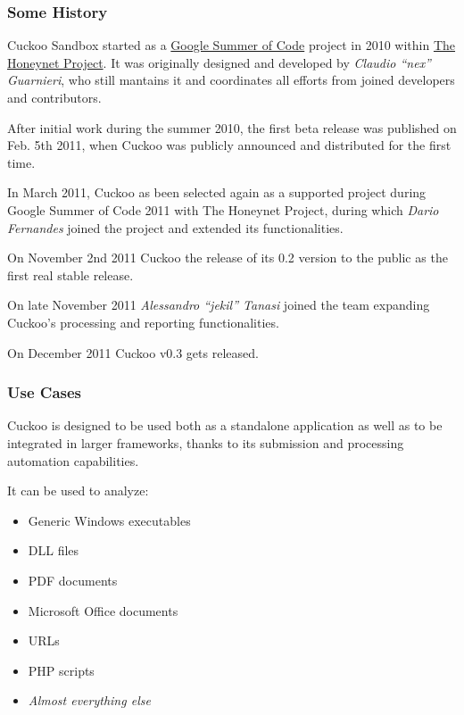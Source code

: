 \documentclass[letterpaper,10pt,english]{sphinxmanual}
\begin{document}
\subsubsection{Some History}
\label{introduction/what:some-history}
Cuckoo Sandbox started as a \href{http://www.google-melange.com}{Google Summer of Code} project in 2010 within
\href{http://www.honeynet.org}{The Honeynet Project}.
It was originally designed and developed by \emph{Claudio “nex” Guarnieri}, who still
mantains it and coordinates all efforts from joined developers and contributors.

After initial work during the summer 2010, the first beta release was published
on Feb. 5th 2011, when Cuckoo was publicly announced and distributed for the
first time.

In March 2011, Cuckoo as been selected again as a supported project during
Google Summer of Code 2011 with The Honeynet Project, during which
\emph{Dario Fernandes} joined the project and extended its functionalities.

On November 2nd 2011 Cuckoo the release of its 0.2 version to the public as the
first real stable release.

On late November 2011 \emph{Alessandro ``jekil'' Tanasi} joined the team expanding
Cuckoo's processing and reporting functionalities.

On December 2011 Cuckoo v0.3 gets released.


\subsubsection{Use Cases}
\label{introduction/what:the-honeynet-project}\label{introduction/what:use-cases}
Cuckoo is designed to be used both as a standalone application as well as to be
integrated in larger frameworks, thanks to its submission and processing
automation capabilities.

It can be used to analyze:
\begin{itemize}
\item {} 
Generic Windows executables

\item {} 
DLL files

\item {} 
PDF documents

\item {} 
Microsoft Office documents

\item {} 
URLs

\item {} 
PHP scripts

\item {} 
\emph{Almost everything else}

\end{itemize}
\end{document}
